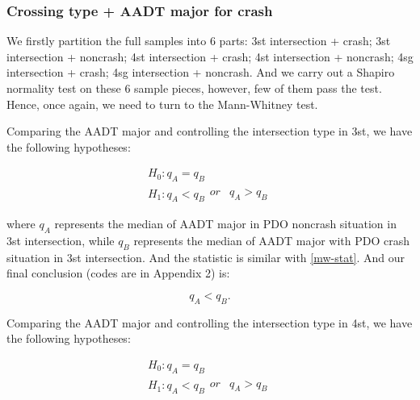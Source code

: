 \documentclass[11pt]{scrartcl} %
\begin{document}
\subsubsection{Crossing type + AADT major for crash}

We firstly partition the full samples into 6 parts: 3st intersection + crash; 3st intersection + noncrash; 4st intersection + crash; 4st intersection + noncrash; 4sg intersection + crash; 4sg intersection + noncrash. And we carry out a Shapiro normality test on these 6 sample pieces, however, few of them pass the test. Hence, once again, we need to turn to the Mann-Whitney test.

\par

Comparing the AADT major and controlling the intersection type in 3st, we have the following hypotheses:

\begin{equation*}
\begin{array}{l}
{H_0}:{q_A} = {q_B}\\
{H_1}:{q_A} < {q_B}\begin{array}{*{20}{c}}
{or}&{{q_A} > {q_B}}
\end{array}
\end{array}
\end{equation*}

where $q_A$ represents the median of AADT major in PDO noncrash situation in 3st intersection, while $q_B$ represents the median of AADT major with PDO crash situation in 3st intersection. And the statistic is similar with \eqref{mw-stat}. And our final conclusion (codes are in Appendix 2) is:

\begin{equation*}
{q_A} < {q_B}.
\end{equation*}

\par

Comparing the AADT major and controlling the intersection type in 4st, we have the following hypotheses:

\begin{equation*}
\begin{array}{l}
{H_0}:{q_A} = {q_B}\\
{H_1}:{q_A} < {q_B}\begin{array}{*{20}{c}}
{or}&{{q_A} > {q_B}}
\end{array}
\end{array}
\end{equation*}
\end{document}
